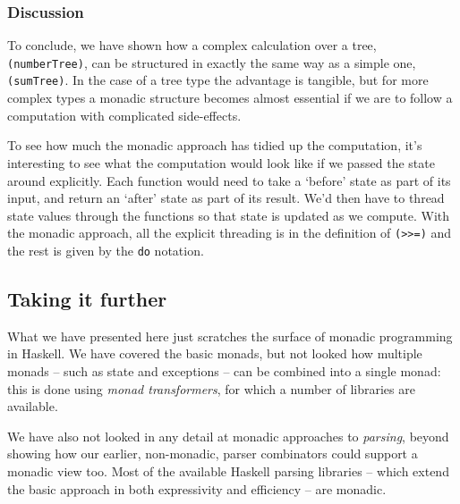 \subsubsection*{Discussion}


To conclude, we have shown how a complex calculation over a tree, 
\texttt{(numberTree)}, can be structured in exactly the same way as a simple one, 
\texttt{(sumTree)}. In the case of a tree type the advantage is tangible, but for more
complex types a monadic structure becomes almost essential if we are to follow
a computation with complicated side-effects. 

To see how much the monadic approach has tidied up the computation, it's interesting to see what the computation would look like if we passed the state around explicitly. Each function would need to take a `before' state as part of its input, and return an `after' state as part of its result. We'd then have to thread state values through the functions so that state is updated as we compute. With the monadic approach, all the explicit threading is in the definition of \texttt{(>>=)} and the rest is given by the \texttt{do} notation.


\subsection*{Taking it further}

What we have presented here just scratches the surface of monadic programming in Haskell. We have covered the basic monads, but not looked how multiple monads -- such as state and exceptions -- can be combined into a single monad: this is done using \emph{monad transformers}, for which a number of libraries are available.

We have also not looked in any detail at monadic approaches to \emph{parsing}, beyond showing how our earlier, non-monadic, parser combinators could support a monadic view too. Most of the available Haskell parsing libraries -- which extend the basic approach in both expressivity and efficiency -- are monadic.

